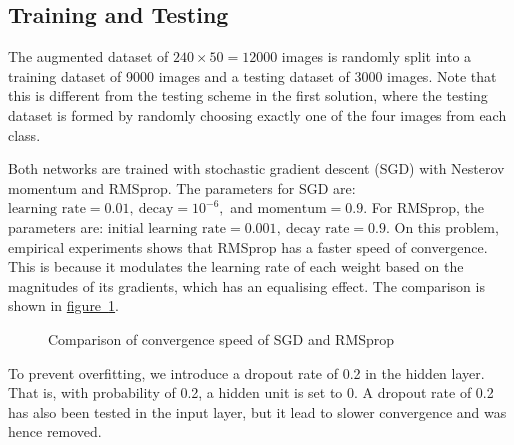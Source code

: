 \documentclass[11pt,a4paper]{article}
\begin{document}
\subsection{Training and Testing}

The augmented dataset of $240\times50=12000$ images is randomly split into a training dataset of 9000 images and a testing dataset of 3000 images. Note that this is different from the testing scheme in the first solution, where the testing dataset is formed by randomly choosing exactly one of the four images from each class.

Both networks are trained with stochastic gradient descent (SGD) with Nesterov momentum and RMSprop\cite{hinton2012mini}. The parameters for SGD are: $\text{learning rate}=0.01,\ \text{decay}=10^{-6},$ and $\text{momentum}=0.9.$ For RMSprop, the parameters are: $\text{initial learning rate}=0.001,\ \text{decay rate}=0.9.$ On this problem, empirical experiments shows that RMSprop has a faster speed of convergence. This is because it modulates the learning rate of each weight based on the magnitudes of its gradients, which has an equalising effect. The comparison is shown in \hyperref[fig:sgd_rmsprop]{figure~\ref{fig:sgd_rmsprop}}.

\begin{figure}[htbp]
\centering
{}
\caption{Comparison of convergence speed of SGD and RMSprop}
\label{fig:sgd_rmsprop}
\end{figure}

To prevent overfitting, we introduce a dropout rate of 0.2 in the hidden layer. That is, with probability of 0.2, a hidden unit is set to 0. A dropout rate of 0.2 has also been tested in the input layer, but it lead to slower convergence and was hence removed.
\end{document}
